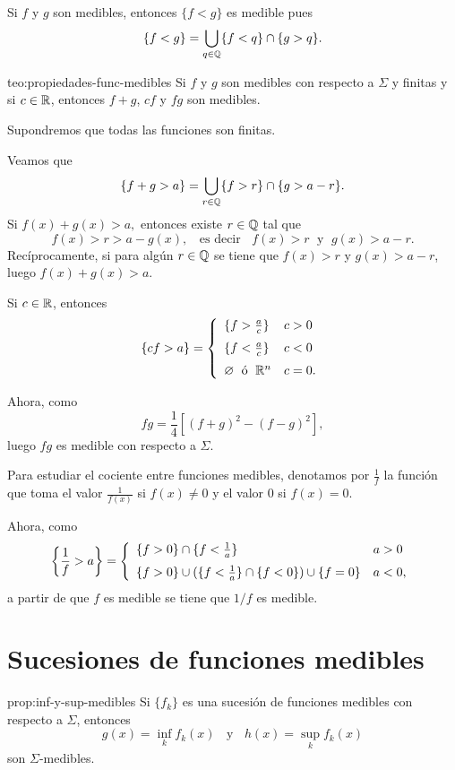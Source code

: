 Si $f$ y $g$ son medibles, entonces $\{f<g\}$ es medible pues
\[
\{f<g\}=\bigcup\limits_{q \in \mathbb{Q}} \{ f<q\} \cap \{ g>q\}.
\]
\begin{teorema}{teo:propiedades-func-medibles}
Si $f$ y $g$ son medibles  con respecto a $\Sigma$ y finitas y si $c\in \mathbb{R}$, entonces
$f+g$, $cf$ y $fg$ son medibles.
\end{teorema}

\begin{demo}
Supondremos que todas las funciones son finitas.

Veamos que 
\[
\{
f+g>a\}=\bigcup\limits_{r \in \mathbb{Q}} \{ f>r\} \cap \{g>a-r\}.
\]
Si $f(x)+g(x)>a,$ entonces existe $r \in \mathbb{Q}$ tal que 
\[
f(x)>r>a-g(x),\;\;\mbox{ es decir }\;\; 
f(x)>r\;\mbox{ y }\; g(x)>a-r.
\]
Rec\'iprocamente, si para alg\'un $r\in \mathbb{Q}$ se tiene que $f(x)>r$ y $g(x)>a-r$, luego $f(x)+g(x)>a$.

Si $c\in \mathbb{R}$, entonces
\[
\{cf>a\}=
\left\{
\begin{array}{ll}
\{f>\frac{a}{c}\}&c>0
\medskip
\\
\{f<\frac{a}{c}\}&c<0
\medskip
\\
\emptyset\;\mbox{ \'o }\;\rr^n &c=0.
\end{array}
\right.
\]

Ahora, como 
\[
fg=\frac{1}{4}\left[(f+g)^2-(f-g)^2\right],
\]
luego $fg$ es medible con respecto a $\Sigma$. 

Para estudiar el cociente entre funciones medibles, denotamos por $\frac{1}{f}$
la funci\'on que toma el valor $\frac{1}{f(x)}$ si $f(x)\neq 0$ y el valor $0$ si $f(x)=0$.

Ahora, como 
\[
\left\{\frac{1}{f}>a\right\}
=
\left \{
\begin{array}{ll}
 \{f>0\} \cap \{f<\frac{1}{a}\}    &  a>0 
 \medskip
 \\
 \{ f>0\} \cup  (\{f<\frac{1}{a}\} \cap \{f<0\}) \cup \{f=0\}
     & a<0, 
\end{array}
\right.
\]
a partir de que $f$ es medible se tiene que  $1/f$ es medible. 
\end{demo}

\section{Sucesiones de funciones medibles}

\begin{proposicion}{prop:inf-y-sup-medibles}
Si $\{f_k\}$ es una sucesi\'on de funciones medibles con respecto a $\Sigma$, 
entonces
\[
g(x)=\inf\limits_{k} f_k(x) \;\;\mbox{ y }\;\; h(x)=\sup\limits_{k} f_k(x) 
\]
son $\Sigma$-medibles. 
\end{proposicion}


